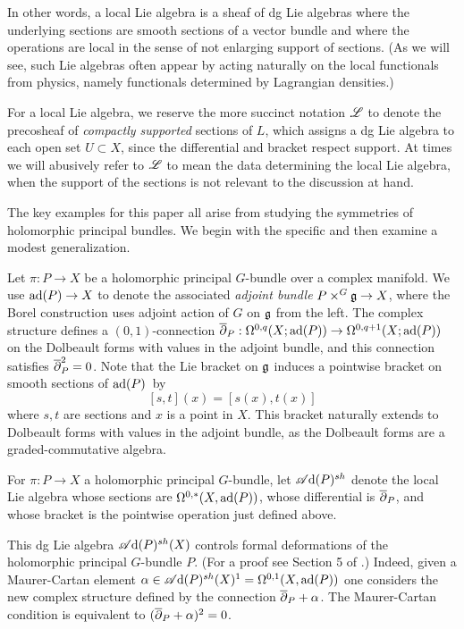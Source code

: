 In other words, a local Lie algebra is a sheaf of dg Lie algebras 
where the underlying sections are smooth sections of a vector bundle and 
where the operations are local in the sense of not enlarging support of sections. 
(As we will see, such Lie algebras often appear by acting naturally on the local functionals from physics, namely functionals determined by Lagrangian densities.)

\begin{rmk}
For a local Lie algebra, we reserve the more succinct notation $\mathscr L$ to denote the precosheaf of {\em compactly supported} sections of $L$,
which assigns a dg Lie algebra to each open set $U \subset X$, 
since the differential and bracket respect support.
At times we will abusively refer to $\mathscr L$ to mean the data determining the local Lie algebra,
when the support of the sections is not relevant to the discussion at hand.
\end{rmk}

The key examples for this paper all arise from studying the symmetries of holomorphic principal bundles.
We begin with the specific and then examine a modest generalization.

Let $\pi : P \to X$ be a holomorphic principal $G$-bundle over a complex manifold.
We use ${\rm ad}(P) \to X$ to denote the associated {\em adjoint bundle} $P \times^{G} \mathfrak g \to X$, 
where the Borel construction uses adjoint action of $G$ on $\mathfrak g$ from the left. 
The complex structure defines a $(0,1)$-connection $\overline{\partial}_P : \Omega^{0,q}(X ; {\rm ad}(P)) \to \Omega^{0,q+1}(X ; {\rm ad}(P))$
on the Dolbeault forms with values in the adjoint bundle,
and this connection satisfies $\overline{\partial}_P^2 = 0$.
Note that the Lie bracket on $\mathfrak g$ induces a pointwise bracket on smooth sections of ${\rm ad}(P)$~by
\[
[s,t](x) = [s(x),t(x)]
\]
where $s, t$ are sections and $x$ is a point in $X$.
This bracket naturally extends to Dolbeault forms with values in the adjoint bundle,
as the Dolbeault forms are a graded-commutative algebra.

\begin{dfn}\label{dfn: adjoint local}
For $\pi : P \to X$ a holomorphic principal $G$-bundle,
let $\mathscr A{\rm d}(P)^{sh}$ denote the local Lie algebra whose sections are $\Omega^{0,*}(X,{\rm ad}(P))$,
whose differential is $\overline{\partial}_P$, and whose bracket is the pointwise operation just defined above.
\end{dfn}

This dg Lie algebra $\mathscr A{\rm d}(P)^{sh}(X)$ controls formal deformations of the holomorphic principal $G$-bundle $P$.
(For a proof see Section 5 of \cite{FHK}.) 
Indeed, given a Maurer-Cartan element $\alpha \in \mathscr A{\rm d}(P)^{sh}(X)^1 = \Omega^{0,1}(X, {\rm ad}(P))$ one considers the new complex structure defined by the connection $\overline{\partial}_P + \alpha$. 
The Maurer-Cartan condition is equivalent to $(\overline{\partial}_P + \alpha)^2 = 0$. 

